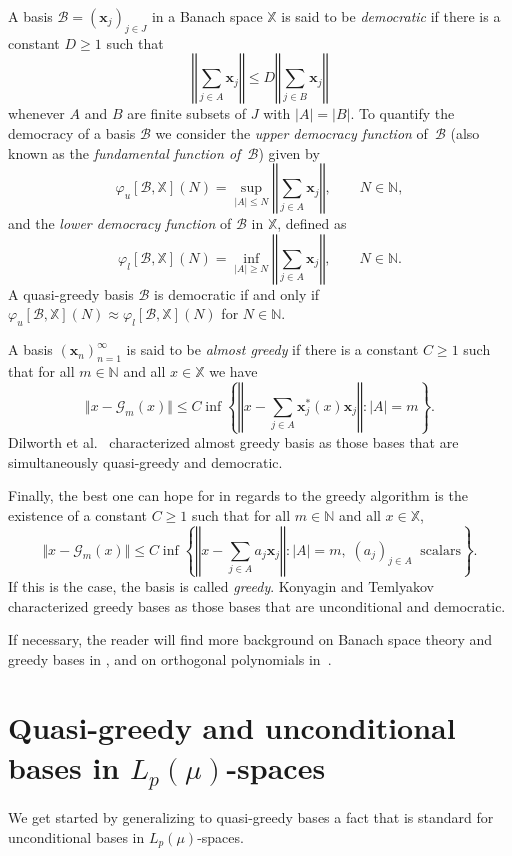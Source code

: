 \documentclass[11pt, leqno]{amsart}
\theoremstyle{remark}
\numberwithin{equation}{section}
\newcommand{\NN}{\ensuremath{\mathbb{N}}}
\newcommand{\XX}{\ensuremath{\mathbb{X}}}
\newcommand{\xx}{\ensuremath{\mathbf{x}}}
\newcommand{\BB}{\mathcal{B}}
\newcommand{\GG}{\mathcal{G}}
\begin{document}
A basis $\BB=(\xx_j)_{j\in J}$ in a Banach space $\XX$ is said to be \textit{democratic} if
there is a constant $D\ge 1$ such that
\[
\left\Vert \sum_{j\in A}\xx_j \right\Vert \le D \left\Vert \sum_{j\in B} \xx_j \right\Vert
\]
whenever $A$ and $B$ are finite subsets of $J$ with $|A|=|B|$.
To quantify the democracy of a basis $\BB$ we consider the \textit{upper democracy function} of~$\BB$ (also known as the \textit{fundamental function of~$\BB$}) given by
\[
 \varphi_{u}[\BB,\XX](N)=\sup_{|A|\le N}\left\Vert \sum_{j\in A}\xx_j\right\Vert, \qquad N\in\NN,
\]
and the \textit{lower democracy function} of $\mathcal B$ in $\XX$, defined as
\[
 \varphi_{l}[\BB,\XX](N)=\inf_{|A|\ge N}\left\Vert \sum_{j\in A}\xx_j\right\Vert, \qquad N\in\NN.
\]
A quasi-greedy basis $\mathcal B$ is democratic if and only if $\varphi_{u}[\BB,\XX](N)\approx \varphi_{l}[\BB,\XX](N)$ for $N\in\NN$.

A basis $(\xx_n)_{n=1}^\infty$ is said to be \textit{almost greedy} if there is a constant $C\ge 1$ such that for all $m\in \NN$ and all $x\in \XX$ we have
\[
 \Vert x-\GG_m(x)\Vert \le C \inf\left\{\left \Vert x-\sum_{j\in A} \xx_j^*(x) \xx_j\right\Vert : |A|=m\right\}.
\]
Dilworth et al.\ \cite{DKKT2003} characterized almost greedy basis as those bases that are simultaneously quasi-greedy and democratic.

Finally, the best one can hope for in regards to the greedy algorithm is the existence of a constant $C\ge 1$ such that for all $m\in \NN$ and all $x\in \XX$,
\[
 \Vert x-\GG_m(x)\Vert \le C \inf\left\{\left \Vert x-\sum_{j\in A} a_{j} \xx_j\right\Vert : |A|=m,\; (a_{j})_{j\in A}\;\;\text{scalars}\right\}.
 \]
If this is the case, the basis is called \textit{greedy}. Konyagin and Temlyakov \cite{KonyaginTemlyakov1999} characterized greedy bases as those bases that are unconditional and democratic.

If necessary, the reader will find more background on Banach space theory and greedy bases in \cite{AlbiacKalton2006}, 
and on orthogonal polynomials in~\cite{Szego}. 

\section{Quasi-greedy and unconditional bases in $L_p(\mu)$-spaces}
\label{UnconditionalLp}

We get started by generalizing to quasi-greedy bases a fact that is standard for unconditional bases in $L_p(\mu)$-spaces.
\end{document}
